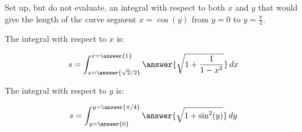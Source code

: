 \documentclass{ximera}
\author{Jim Talamo}
\begin{document}
\begin{exercise}

Set up, but do not evaluate, an integral with respect to both $x$ and $y$ that would give the length of the curve segment $x=\cos(y)$ from $y=0$ to $y=\frac{\pi}{4}$.

The integral with respect to $x$ is:

\[
s= \int_{
  x=\answer{\sqrt{2}/2}}
  ^{x=\answer{1}}
  \answer{\sqrt{1+\frac{1}{1-x^2}}} \d x
\]

The integral with respect to $y$ is:

\[
s= \int_{y=\answer{0}}^{y=\answer{\pi/4}} \answer{\sqrt{1+\sin^2(y)}} \d y
\]

\end{exercise}
\end{document}
